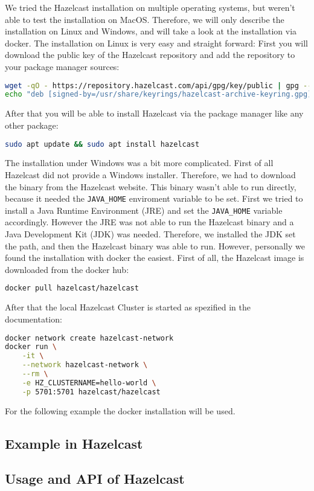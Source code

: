 We tried the Hazelcast installation on multiple operating systems, but weren't
able to test the installation on MacOS. Therefore, we will only describe the
installation on Linux and Windows, and will take a look at the installation via
docker. The installation on Linux is very easy and straight forward: First you
will download the public key of the Hazelcast repository and add the repository
to your package manager sources:
\begin{lstlisting}[language=bash,caption={Adding the Hazelcast repository to the package manager sources under Linux (Debian) \parencite{hazelcast_installing_nodate}}]
wget -qO - https://repository.hazelcast.com/api/gpg/key/public | gpg --dearmor | sudo tee /usr/share/keyrings/hazelcast-archive-keyring.gpg > /dev/null
echo "deb [signed-by=/usr/share/keyrings/hazelcast-archive-keyring.gpg] https://repository.hazelcast.com/debian stable main" | sudo tee -a /etc/apt/sources.list
\end{lstlisting}
After that you will be able to install Hazelcast via the package manager like
any other package:
\begin{lstlisting}[language=bash,caption={Installing Hazelcast under Linux (Debian) \parencite{hazelcast_installing_nodate}}]
sudo apt update && sudo apt install hazelcast
\end{lstlisting}
The installation under Windows was a bit more complicated. First of all
Hazelcast did not provide a Windows installer. Therefore, we had to download the
binary from the Hazelcast website. This binary wasn't able to run directly,
because it needed the \texttt{JAVA\_HOME} enviroment variable to be set. First we
tried to install a Java Runtime Environment (JRE) and set the \texttt{JAVA\_HOME}
variable accordingly. However the JRE was not able to run the Hazelcast binary
and a Java Development Kit (JDK) was needed. Therefore, we installed the JDK set
the path, and then the Hazelcast binary was able to run. However, personally we
found the installation with docker the easiest. 
First of all, the Hazelcast image is downloaded from the docker hub:
\begin{lstlisting}[language=bash,caption={Downloading the Hazelcast image from the docker hub \parencite{hazelcast_installing_nodate}}]
docker pull hazelcast/hazelcast
\end{lstlisting}
After that the local Hazelcast Cluster is started as spezified in the
documentation:
\begin{lstlisting}[language=bash,caption={Starting the Hazelcast Cluster using the docker image \parencite{hazelcast_start_2023}}]
docker network create hazelcast-network
docker run \
    -it \
    --network hazelcast-network \
    --rm \
    -e HZ_CLUSTERNAME=hello-world \
    -p 5701:5701 hazelcast/hazelcast
\end{lstlisting}

For the following example the docker installation will be used. 

\subsection{Example in Hazelcast}
\todo{}

\subsection{Usage and API of Hazelcast}

